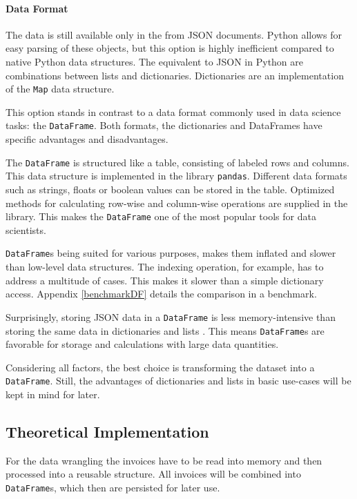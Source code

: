         \paragraph{Data Format}
        The data is still available only in the from \ac{JSON} documents. Python allows for easy parsing of these objects, but this option is highly inefficient compared to native Python data structures.
        The equivalent to \ac{JSON} in Python are combinations between lists and dictionaries. Dictionaries are an implementation of the \lstinline|Map| data structure.
        
        This option stands in contrast to a data format commonly used in data science tasks: the \lstinline|DataFrame|. Both formats, the dictionaries and DataFrames have specific advantages and disadvantages.
        
        The \lstinline|DataFrame| is structured like a table, consisting of labeled rows and columns. This data structure is implemented in the library \lstinline|pandas|. 
        Different data formats such as strings, floats or boolean values can be stored in the table.        Optimized methods for calculating row-wise and column-wise operations are supplied in the library. This makes the \lstinline|DataFrame| one of the most popular tools for data scientists.
        
       \lstinline|DataFrame|s being suited for various purposes, makes them inflated and slower than low-level data structures. The indexing operation, for example, has to address a multitude of cases. This makes it slower than a simple dictionary access. Appendix \ref{benchmarkDF} details the comparison in a benchmark.
       
       Surprisingly, storing \ac{JSON} data in a \lstinline|DataFrame| is less memory-intensive than storing the same data in dictionaries and lists \cite{DFvsJSON}. This means  \lstinline|DataFrame|s are favorable for storage and calculations with large data quantities.
       
       Considering all factors, the best choice is transforming the dataset into a  \lstinline|DataFrame|. Still, the advantages of dictionaries and lists in basic use-cases will be kept in mind for later.
     
    \subsection{Theoretical Implementation}
    For the data wrangling the invoices have to be read into memory and then processed into a reusable structure. All invoices will be combined into \lstinline|DataFrame|s, which then are persisted for later use.
	
